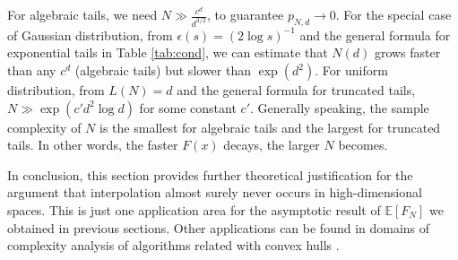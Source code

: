 \documentclass{aptpub}
\def\E{\mathbb{E}}
\begin{document}
For algebraic tails, we need $N\gg \frac{c^d}{d^{3/2}}$,
to guarantee $p_{N,d}\to 0$.  
For the special case of Gaussian distribution,
from $\epsilon(s)=(2\log s)^{-1}$ and the general formula for exponential tails in Table \ref{tab:cond},
we can estimate that
$N(d)$ grows faster than any $c^d$ (algebraic tails) but slower than $\exp(d^2)$.
For uniform distribution, from $L(N)=d$ and the general formula for truncated tails,
$N\gg \exp(c' d^2 \log d)$ for some constant $c'$.
Generally speaking, the sample complexity of $N$ is the smallest for algebraic tails and the largest
for truncated tails. In other words, the faster $F(x)$ decays, the larger $N$ becomes.

In conclusion, this section provides further theoretical justification for the argument that interpolation almost surely never occurs in high-dimensional spaces.
This is just one application area for the asymptotic result of $\E[F_N]$ we obtained in previous sections.
Other applications can be found in domains of complexity analysis of algorithms related with convex hulls
\cite{seidel1997}.





\appendix
\end{document}
